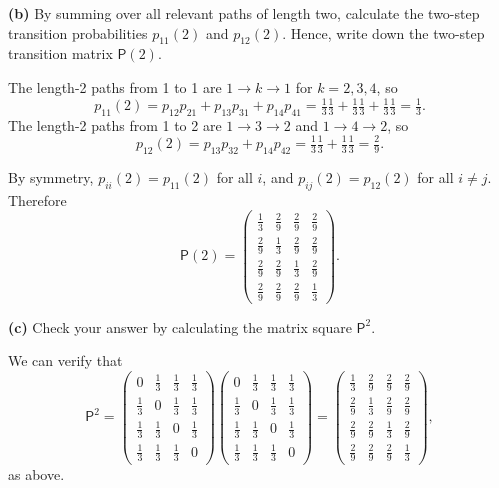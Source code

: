 \documentclass[
  a4paper,
]{article}
\theoremstyle{definition}
\theoremstyle{definition}
\theoremstyle{definition}
\theoremstyle{remark}
\begin{document}
\textbf{(b)} By summing over all relevant paths of length two, calculate the two-step transition probabilities \(p_{11}(2)\) and \(p_{12}(2)\). Hence, write down the two-step transition matrix \(\mathsf P(2)\).

\begin{myanswers}
The length-2 paths from 1 to 1 are \(1 \to k \to 1\) for \(k = 2,3,4\), so
\[ p_{11}(2) = p_{12}p_{21} + p_{13}p_{31} + p_{14}p_{41} = \tfrac13 \tfrac13 +  \tfrac13 \tfrac13 + \tfrac13 \tfrac13 = \tfrac13  .   \]
The length-2 paths from 1 to 2 are \(1 \to 3 \to 2\) and \(1 \to 4 \to 2\), so
\[ p_{12}(2) = p_{13}p_{32} + p_{14}p_{42} = \tfrac13 \tfrac13 + \tfrac13 \tfrac13 = \tfrac29 . \]

By symmetry, \(p_{ii}(2) = p_{11}(2)\) for all \(i\), and \(p_{ij}(2) = p_{12}(2)\) for all \(i \neq j\). Therefore
\[ \mathsf P(2) = \begin{pmatrix} \frac13 & \frac29 & \frac29 & \frac29 \\
                               \frac29 & \frac13 & \frac29 & \frac29 \\
                               \frac29 & \frac29 & \frac13 & \frac29 \\
                               \frac29 & \frac29 & \frac29 & \frac13 \end{pmatrix} . \]

\end{myanswers}

\textbf{(c)} Check your answer by calculating the matrix square \(\mathsf P^2\).

\begin{myanswers}
We can verify that
\[ \mathsf P^2 = \begin{pmatrix} 0 & \frac13 & \frac13 & \frac13 \\
\frac13 & 0 & \frac13 & \frac13 \\
\frac13 & \frac13 & 0 & \frac13 \\
\frac13 & \frac13 & \frac13 & 0 \end{pmatrix} \begin{pmatrix} 0 & \frac13 & \frac13 & \frac13 \\
\frac13 & 0 & \frac13 & \frac13 \\
\frac13 & \frac13 & 0 & \frac13 \\
\frac13 & \frac13 & \frac13 & 0 \end{pmatrix}=
\begin{pmatrix} \frac13 & \frac29 & \frac29 & \frac29 \\
\frac29 & \frac13 & \frac29 & \frac29 \\
\frac29 & \frac29 & \frac13 & \frac29 \\
\frac29 & \frac29 & \frac29 & \frac13 \end{pmatrix} , \]
as above.

\end{myanswers}
\end{document}

